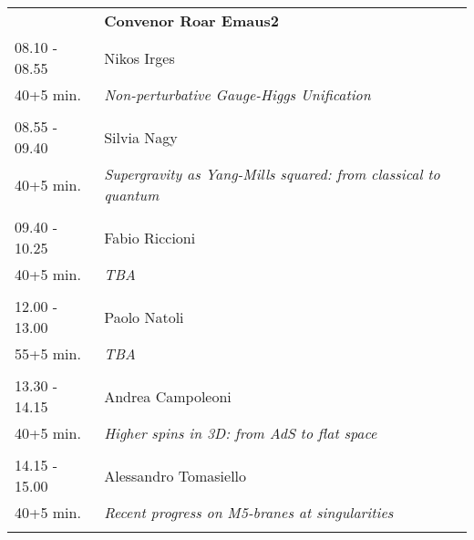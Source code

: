 \begin{longtable}{p{3cm}p{13cm}}
&\hfill {\bf Convenor Roar Emaus2 }\\ 
08.10 - 08.55 & Nikos Irges\\ 
40+5 min. & {\it Non-perturbative Gauge-Higgs Unification}\\ 
 & \\ 
08.55 - 09.40 & Silvia Nagy\\ 
40+5 min. & {\it Supergravity as Yang-Mills squared: from classical to quantum}\\ 
 & \\ 
09.40 - 10.25 & Fabio Riccioni\\ 
40+5 min. & {\it TBA}\\ 
 & \\ 
12.00 - 13.00 & Paolo Natoli\\ 
55+5 min. & {\it TBA}\\ 
 & \\ 
13.30 - 14.15 & Andrea Campoleoni\\ 
40+5 min. & {\it Higher spins in 3D: from AdS to flat space}\\ 
 & \\ 
14.15 - 15.00 & Alessandro Tomasiello\\ 
40+5 min. & {\it Recent progress on M5-branes at singularities}\\ 
 & \\ 
\end{longtable}

